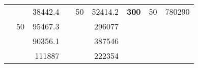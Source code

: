 \begin{table}[H]
\begin{tabular}{|ccrccrccc}
\rowcolor[HTML]{DDFDFF} 
\multicolumn{1}{|c|}{\cellcolor[HTML]{FFFFC7}}                                & \multicolumn{1}{c|}{\cellcolor[HTML]{DDFDFF}}                      & \multicolumn{1}{r|}{\cellcolor[HTML]{DAE8FC}38442.4}   & \multicolumn{1}{c|}{\cellcolor[HTML]{FFFFC7}}                                & \multicolumn{1}{c|}{\multirow{-10}{*}{\cellcolor[HTML]{DDFDFF}50}}  & \multicolumn{1}{r|}{\cellcolor[HTML]{DDFDFF}52414.2}   & \multicolumn{1}{c|}{\multirow{-19}{*}{\cellcolor[HTML]{FFFFC7}\textbf{300}}} & \multicolumn{1}{c|}{\multirow{-10}{*}{\cellcolor[HTML]{DDFDFF}50}} & \multicolumn{1}{r|}{\cellcolor[HTML]{DDFDFF}780290}    \\ \cline{3-3} \cline{5-9} 
\multicolumn{1}{|c|}{\cellcolor[HTML]{FFFFC7}}                                & \multicolumn{1}{c|}{\multirow{-10}{*}{\cellcolor[HTML]{DDFDFF}50}} & \multicolumn{1}{r|}{\cellcolor[HTML]{DDFDFF}95467.3}   & \multicolumn{1}{c|}{\cellcolor[HTML]{FFFFC7}}                                & \multicolumn{1}{c|}{\cellcolor[HTML]{DAE8FC}}                       & \multicolumn{1}{r|}{\cellcolor[HTML]{DAE8FC}296077}    &                                                                              &                                                                    &                                                        \\ \cline{2-3} \cline{6-6}
\multicolumn{1}{|c|}{\cellcolor[HTML]{FFFFC7}}                                & \multicolumn{1}{c|}{\cellcolor[HTML]{DAE8FC}}                      & \multicolumn{1}{r|}{\cellcolor[HTML]{DAE8FC}90356.1}   & \multicolumn{1}{c|}{\cellcolor[HTML]{FFFFC7}}                                & \multicolumn{1}{c|}{\cellcolor[HTML]{DAE8FC}}                       & \multicolumn{1}{r|}{\cellcolor[HTML]{DDFDFF}387546}    &                                                                              &                                                                    &                                                        \\ \cline{3-3} \cline{6-6}
\multicolumn{1}{|c|}{\cellcolor[HTML]{FFFFC7}}                                & \multicolumn{1}{c|}{\cellcolor[HTML]{DAE8FC}}                      & \multicolumn{1}{r|}{\cellcolor[HTML]{DDFDFF}111887}    & \multicolumn{1}{c|}{\cellcolor[HTML]{FFFFC7}}                                & \multicolumn{1}{c|}{\cellcolor[HTML]{DAE8FC}}                       & \multicolumn{1}{r|}{\cellcolor[HTML]{DAE8FC}222354}    &                                                                              &                                                                    &                                                        \\ \cline{3-3} \cline{6-6}

\end{tabular}
\end{table}
